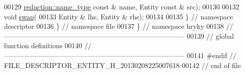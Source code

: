 \begin{DoxyCode}
00129         \hyperlink{namespacehryky_1_1reduction_ac686c30a4c8d196bbd0f05629a6b921f}{reduction::name_type} \textcolor{keyword}{const} & name, Entity \textcolor{keyword}{const} & src);
00130 
00132     \textcolor{keywordtype}{void} \hyperlink{namespacehryky_a4282146df5ea2b68cb667896a2205909}{swap}(
00133         Entity & lhs, Entity & rhs);
00134 
00135 \} \textcolor{comment}{// namespace descriptor}
00136 \} \textcolor{comment}{// namespace file}
00137 \} \textcolor{comment}{// namespace hryky}
00138 \textcolor{comment}{//
      ------------------------------------------------------------------------------}
00139 \textcolor{comment}{// global function definitions}
00140 \textcolor{comment}{//
      ------------------------------------------------------------------------------}
00141 \textcolor{preprocessor}{#endif // FILE\_DESCRIPTOR\_ENTITY\_H\_20130208225007618}
00142 \textcolor{preprocessor}{}\textcolor{comment}{// end of file}
\end{DoxyCode}
